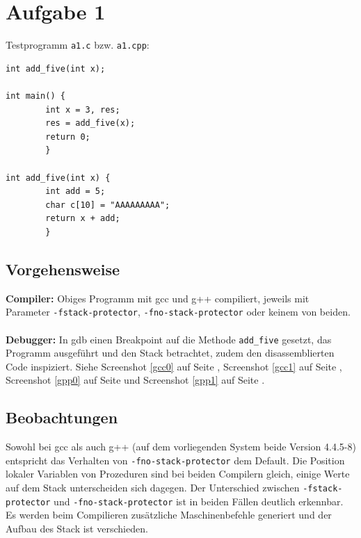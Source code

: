 \documentclass[11pt,a4paper]{article}
\begin{document}
\lstset{language=C}


\clearpage
\setcounter{page}{1}
\tableofcontents

\section{Aufgabe 1}
\setcounter{page}{1}
Testprogramm \texttt{a1.c} bzw. \texttt{a1.cpp}:
\begin{lstlisting}[frame=single]
int add_five(int x);

int main() {
        int x = 3, res;
        res = add_five(x);
        return 0;
        }

int add_five(int x) {
        int add = 5;
        char c[10] = "AAAAAAAAA";
        return x + add;
        }
\end{lstlisting}
\subsection{Vorgehensweise}
\textbf{Compiler:} Obiges Programm mit gcc und g++ compiliert, jeweils mit Parameter \texttt{-fstack-protector}, \texttt{-fno-stack-protector} oder keinem von beiden.\\
\\
\textbf{Debugger:} In gdb einen Breakpoint auf die Methode \texttt{add\_five} gesetzt, das Programm ausgeführt und den Stack betrachtet, zudem den disassemblierten Code inspiziert. Siehe Screenshot \ref{gcc0} auf Seite \pageref{gcc0}, Screenshot \ref{gcc1} auf Seite \pageref{gcc1}, Screenshot \ref{gpp0} auf Seite \pageref{gpp0} und Screenshot \ref{gpp1} auf Seite \pageref{gpp1}.
\subsection{Beobachtungen}
Sowohl bei gcc als auch g++ (auf dem vorliegenden System beide Version 4.4.5-8) entspricht das Verhalten von \texttt{-fno-stack-protector} dem Default. Die Position lokaler Variablen von Prozeduren sind bei beiden Compilern gleich, einige Werte auf dem Stack unterscheiden sich dagegen. Der Unterschied zwischen \texttt{-fstack-protector} und \texttt{-fno-stack-protector} ist in beiden Fällen deutlich erkennbar. Es werden beim Compilieren zusätzliche Maschinenbefehle generiert und der Aufbau des Stack ist verschieden.
\end{document}
